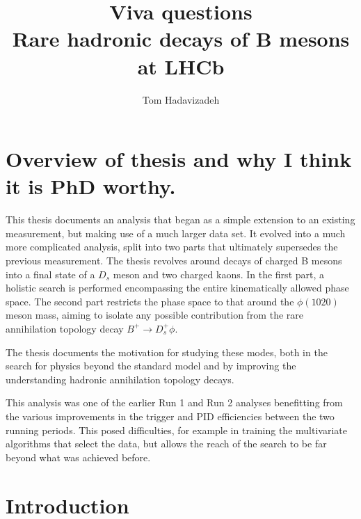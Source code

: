\documentclass[12pt]{article}
\title{Viva questions\\
Rare hadronic decays of B mesons at LHCb}
\author{Tom Hadavizadeh}
\begin{document}
\maketitle



\section{Overview of thesis and why I think it is PhD worthy.}

This thesis documents an analysis that began as a simple extension to an existing measurement, but making use of a much larger data set. It evolved into a much more complicated analysis, split into two parts that ultimately supersedes the previous measurement. 
The thesis revolves around decays of charged B mesons into a final state of a $D_s$ meson and two charged kaons. In the first part, a holistic search is performed encompassing the entire kinematically allowed phase space. The second part restricts the phase space to that around the $\phi(1020)$ meson mass, aiming to isolate any possible contribution from the rare annihilation topology decay $B^{+} \rightarrow D_s^+ \phi$.   

The thesis documents the motivation for studying these modes, both in the search for physics beyond the standard model and by improving the understanding hadronic annihilation topology decays. 

This analysis was one of the earlier Run 1 and Run 2 analyses benefitting from the various improvements in the trigger and PID efficiencies between the two running periods. This posed difficulties, for example in training the multivariate algorithms that select the data, but allows the reach of the search to be far beyond what was achieved before.   

\section{Introduction}
\end{document}
